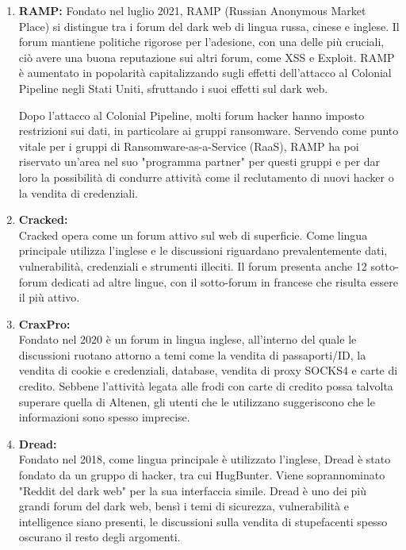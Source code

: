 \begin{enumerate}
    \item \textbf{RAMP:}
    Fondato nel luglio 2021, RAMP (Russian Anonymous Market Place) si distingue tra i forum del dark web di lingua russa, cinese e inglese. Il forum mantiene politiche rigorose per l'adesione, con una delle più cruciali, ciò avere una buona reputazione sui altri forum, come XSS e Exploit. RAMP è aumentato in popolarità capitalizzando sugli effetti dell'attacco al Colonial Pipeline negli Stati Uniti, sfruttando i suoi effetti sul dark web.

    Dopo l'attacco al Colonial Pipeline, molti forum hacker hanno imposto restrizioni sui dati, in particolare ai gruppi ransomware. Servendo come punto vitale per i gruppi di Ransomware-as-a-Service (RaaS), RAMP ha poi riservato un'area  nel suo "programma partner" per questi gruppi e per dar loro la possibilità di condurre attività come il reclutamento di nuovi hacker o la vendita di credenziali.

    \item \textbf{Cracked:}
    \\Cracked opera come un forum attivo sul web di superficie. Come lingua principale utilizza l'inglese e le discussioni riguardano prevalentemente dati, vulnerabilità, credenziali e strumenti illeciti. Il forum presenta anche 12 sotto-forum dedicati ad altre lingue, con il sotto-forum in francese che risulta essere il più attivo.

    \item \textbf{CraxPro:}
    \\Fondato nel 2020 è un forum in lingua inglese, all'interno del quale le discussioni ruotano attorno a temi come la vendita di passaporti/ID, la vendita di cookie e credenziali, database, vendita di proxy SOCKS4 e carte di credito. Sebbene l'attività legata alle frodi con carte di credito possa talvolta superare quella di Altenen, gli utenti che le utilizzano suggeriscono che le informazioni sono spesso imprecise.

    \item \textbf{Dread:}
    \\Fondato nel 2018, come lingua principale è utilizzato l'inglese, Dread è stato fondato da un gruppo di hacker, tra cui HugBunter. Viene soprannominato "Reddit del dark web" per la sua interfaccia simile. Dread è uno dei più grandi forum del dark web, bensì i temi di sicurezza, vulnerabilità e intelligence siano presenti, le discussioni sulla vendita di stupefacenti spesso oscurano il resto degli argomenti.
\end{enumerate}
\cite{implic3}


